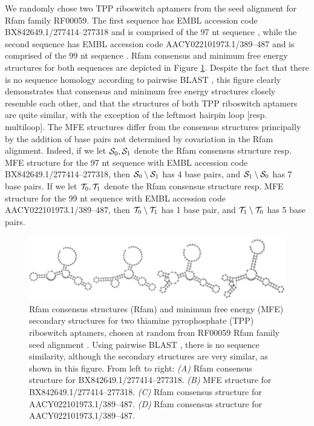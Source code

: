 We randomly chose two TPP riboswitch
aptamers from the seed alignment for
Rfam family RF00059. The first sequence has EMBL accession code
BX842649.1/277414--277318 and is comprised of the 97 nt sequence
, while the second sequence
has EMBL accession code AACY022101973.1/389--487 and is comprised of the 99
nt sequence
.
Rfam consensus and minimum free energy structures for both sequences are
depicted in Figure \ref{fig:fftbor:tppConsensusAndMfe}.
Despite the fact that there is no sequence homology according to
pairwise BLAST \citep{blast}, this figure clearly demonstrates that
consensus and
minimum free energy structures closely resemble each other, and that the
structures of both TPP riboswitch aptamers are quite similar, with the
exception of the leftmost hairpin loop [resp. multiloop].
The MFE structures differ
from the consensus structures principally by the addition of base pairs not
determined by covariation in the Rfam alignment.
Indeed, if we let $\mathcal S_0,\mathcal S_1$
denote the Rfam consensus structure resp. MFE structure for the 97 nt
sequence with EMBL accession code BX842649.1/277414--277318, then
$\mathcal S_0 \setminus \mathcal S_1$ has 4 base pairs, and $\mathcal S_1 \setminus \mathcal S_0$
 has 7
base pairs. If we let $\mathcal T_0,\mathcal T_1$
denote the Rfam consensus structure resp. MFE structure for the 99 nt
sequence with EMBL accession code
AACY022101973.1/389--487, then
$\mathcal T_0 \setminus \mathcal T_1$ has 1 base pair, and $\mathcal T_1 \setminus \mathcal T_0$ has 5
base pairs.

\begin{figure}[!ht]
\centering
\includegraphics[width=.9\textwidth]{Figures/FFTbor/tppConsensusAndMfe.pdf}
\caption{Rfam consensus structures (Rfam) and minimum free energy (MFE)
secondary structures for two thiamine pyrophosphate (TPP) riboswitch aptamers,
chosen at random from RF00059 Rfam family seed alignment
\citep{Gardner.nar11}. Using pairwise BLAST \citep{blast}, there is no
sequence similarity, although the secondary structures are very similar,
as shown in this figure. From left to right:
{\em (A)} Rfam consensus structure for BX842649.1/277414--277318.
{\em (B)} MFE structure for BX842649.1/277414--277318.
{\em (C)} Rfam consensus structure for AACY022101973.1/389--487.
{\em (D)} Rfam consensus structure for AACY022101973.1/389--487.
}
\label{fig:fftbor:tppConsensusAndMfe}
\end{figure}

